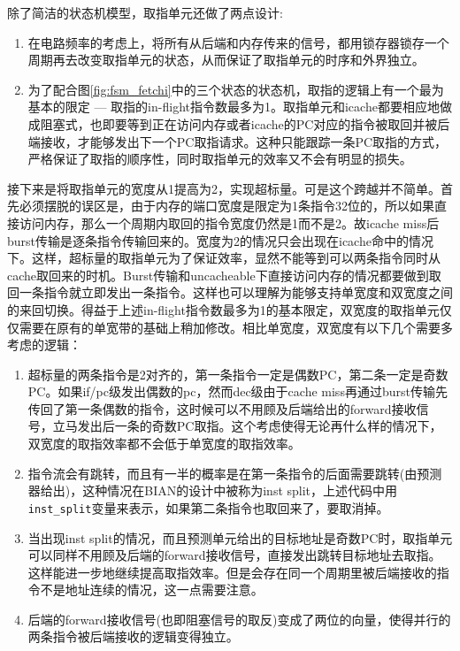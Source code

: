 除了简洁的状态机模型，取指单元还做了两点设计:
\begin{enumerate}[label=(\alph*)]
	\item 在电路频率的考虑上，将所有从后端和内存传来的信号，都用锁存器锁存一个周期再去改变取指单元的状态，从而保证了取指单元的时序和外界独立。
	\item 为了配合图\ref{fig:fsm_fetchi}中的三个状态的状态机，取指的逻辑上有一个最为基本的限定 --- 取指的in-flight指令数最多为1。取指单元和icache都要相应地做成阻塞式，也即要等到正在访问内存或者icache的PC对应的指令被取回并被后端接收，才能够发出下一个PC取指请求。这种只能跟踪一条PC取指的方式，严格保证了取指的顺序性，同时取指单元的效率又不会有明显的损失。
\end{enumerate}

接下来是将取指单元的宽度从1提高为2，实现超标量。可是这个跨越并不简单。首先必须摆脱的误区是，由于内存的端口宽度是限定为1条指令32位的，所以如果直接访问内存，那么一个周期内取回的指令宽度仍然是1而不是2。故icache miss后burst传输是逐条指令传输回来的。宽度为2的情况只会出现在icache命中的情况下。这样，超标量的取指单元为了保证效率，显然不能等到可以两条指令同时从cache取回来的时机。Burst传输和uncacheable下直接访问内存的情况都要做到取回一条指令就立即发出一条指令。这样也可以理解为能够支持单宽度和双宽度之间的来回切换。得益于上述in-flight指令数最多为1的基本限定，双宽度的取指单元仅仅需要在原有的单宽带的基础上稍加修改。相比单宽度，双宽度有以下几个需要多考虑的逻辑：
\begin{enumerate}[label=(\alph*)]
	\item 超标量的两条指令是2对齐的，第一条指令一定是偶数PC，第二条一定是奇数PC。如果if/pc级发出偶数的pc，然而dec级由于cache miss再通过burst传输先传回了第一条偶数的指令，这时候可以不用顾及后端给出的forward接收信号，立马发出后一条的奇数PC取指。这个考虑使得无论再什么样的情况下，双宽度的取指效率都不会低于单宽度的取指效率。
	\item 指令流会有跳转，而且有一半的概率是在第一条指令的后面需要跳转(由预测器给出)，这种情况在BIAN的设计中被称为inst split，上述代码中用\texttt{inst\_split}变量来表示，如果第二条指令也取回来了，要取消掉。
	\item 当出现inst split的情况，而且预测单元给出的目标地址是奇数PC时，取指单元可以同样不用顾及后端的forward接收信号，直接发出跳转目标地址去取指。这样能进一步地继续提高取指效率。但是会存在同一个周期里被后端接收的指令不是地址连续的情况，这一点需要注意。
	\item 后端的forward接收信号(也即阻塞信号的取反)变成了两位的向量，使得并行的两条指令被后端接收的逻辑变得独立。
\end{enumerate}

